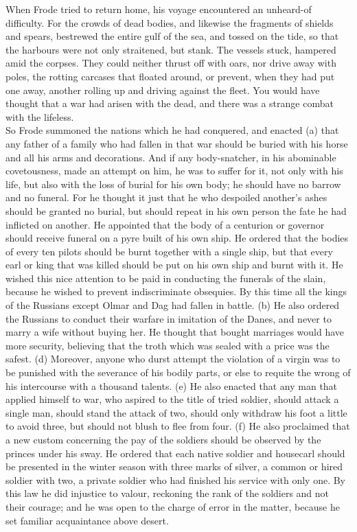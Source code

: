 \documentclass[10pt,a4paper]{report}
\begin{document}
When Frode tried to return home, his voyage encountered an unheard-of difficulty. For the crowds of dead bodies, and likewise the fragments of shields and spears, bestrewed the entire gulf of the sea, and tossed on the tide, so that the harbours were not only straitened, but stank. The vessels stuck, hampered amid the corpses. They could neither thrust off with oars, nor drive away with poles, the rotting carcases that floated around, or prevent, when they had put one away, another rolling up and driving against the fleet. You would have thought that a war had arisen with the dead, and there was a strange combat with the lifeless.\\

So Frode summoned the nations which he had conquered, and enacted (a) that any father of a family who had fallen in that war should be buried with his horse and all his arms and decorations. And if any body-snatcher, in his abominable covetousness, made an attempt on him, he was to suffer for it, not only with his life, but also with the loss of burial for his own body; he should have no barrow and no funeral. For he thought it just that he who despoiled another's ashes should be granted no burial, but should repeat in his own person the fate he had inflicted on another. He appointed that the body of a centurion or governor should receive funeral on a pyre built of his own ship. He ordered that the bodies of every ten pilots should be burnt together with a single ship, but that every earl or king that was killed should be put on his own ship and burnt with it. He wished this nice attention to be paid in conducting the funerals of the slain, because he wished to prevent indiscriminate obsequies. By this time all the kings of the Russians except Olmar and Dag had fallen in battle. (b) He also ordered the Russians to conduct their warfare in imitation of the Danes, and never to marry a wife without buying her. He thought that bought marriages would have more security, believing that the troth which was sealed with a price was the safest. (d) Moreover, anyone who durst attempt the violation of a virgin was to be punished with the severance of his bodily parts, or else to requite the wrong of his intercourse with a thousand talents. (e) He also enacted that any man that applied himself to war, who aspired to the title of tried soldier, should attack a single man, should stand the attack of two, should only withdraw his foot a little to avoid three, but should not blush to flee from four. (f) He also proclaimed that a new custom concerning the pay of the soldiers should be observed by the princes under his sway. He ordered that each native soldier and housecarl should be presented in the winter season with three marks of silver, a common or hired soldier with two, a private soldier who had finished his service with only one. By this law he did injustice to valour, reckoning the rank of the soldiers and not their courage; and he was open to the charge of error in the matter, because he set familiar acquaintance above desert.\\
\end{document}
